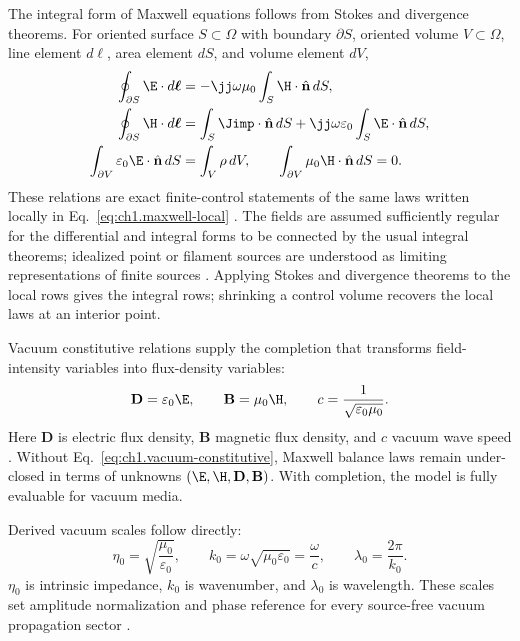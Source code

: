 The integral form of Maxwell equations follows from Stokes and divergence theorems.
For oriented surface \(S\subset\Omega\) with boundary \(\partial S\), oriented
volume \(V\subset\Omega\), line element \(d\boldsymbol{\ell}\), area element \(dS\),
and volume element \(dV\),
\begin{equation}
\label{eq:ch1.maxwell-integral}
\begin{aligned}
\oint_{\partial S}\E\cdot d\boldsymbol{\ell}
&=-\jj\omega\mu_0\int_S\H\cdot\hat{\mathbf{n}}\,dS,\\
\oint_{\partial S}\H\cdot d\boldsymbol{\ell}
&=\int_S\Jimp\cdot\hat{\mathbf{n}}\,dS
+\jj\omega\varepsilon_0\int_S\E\cdot\hat{\mathbf{n}}\,dS,\\
\int_{\partial V}\varepsilon_0\E\cdot\hat{\mathbf{n}}\,dS
&=\int_V\rho\,dV,\qquad
\int_{\partial V}\mu_0\H\cdot\hat{\mathbf{n}}\,dS=0.
\end{aligned}
\end{equation}
These relations are exact finite-control statements of the same laws written
locally in Eq.~\eqref{eq:ch1.maxwell-local}
\cite{stratton1941}. The fields are assumed sufficiently regular for the differential and integral forms to be connected by the usual integral theorems; idealized point or filament sources are understood as limiting representations of finite sources \cite{stratton1941}. \label{prop:ch1.local-integral-equivalence}
Applying Stokes and divergence theorems to the local rows gives the integral rows; shrinking a control volume recovers the local laws at an interior point.

Vacuum constitutive relations supply the completion that transforms field-intensity
variables into flux-density variables:
\begin{equation}
\label{eq:ch1.vacuum-constitutive}
\mathbf{D}=\varepsilon_0\E,\qquad
\mathbf{B}=\mu_0\H,\qquad
c=\frac{1}{\sqrt{\varepsilon_0\mu_0}}.
\end{equation}
Here \(\mathbf{D}\) is electric flux density, \(\mathbf{B}\) magnetic flux density,
and \(c\) vacuum wave speed \cite{stratton1941}. Without
Eq.~\eqref{eq:ch1.vacuum-constitutive}, Maxwell balance laws remain under-closed in
terms of unknowns \((\E,\H,\mathbf{D},\mathbf{B})\). With completion, the model is
fully evaluable for vacuum media.

Derived vacuum scales follow directly:
\begin{equation}
\label{eq:ch1.vacuum-impedance-wavenumber}
\eta_0=\sqrt{\frac{\mu_0}{\varepsilon_0}},\qquad
k_0=\omega\sqrt{\mu_0\varepsilon_0}=\frac{\omega}{c},\qquad
\lambda_0=\frac{2\pi}{k_0}.
\end{equation}
\(\eta_0\) is intrinsic impedance, \(k_0\) is wavenumber, and \(\lambda_0\) is
wavelength. These scales set amplitude normalization and phase reference for every source-free
vacuum propagation sector \cite{stratton1941}.

